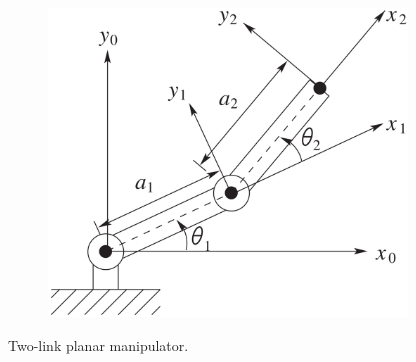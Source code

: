 \begin{frame}
\begin{columns}
\begin{column}{0.4\textwidth}
\begin{figure}[bth]
                \includegraphics[width=0.85\textwidth]{figures/two_link_planar_manipulator.png} 
            \end{figure}
            \vspace{-2mm}
            \centering
            \footnotesize{Two-link planar manipulator.}
        \end{column}
    \end{columns}
\end{frame}

